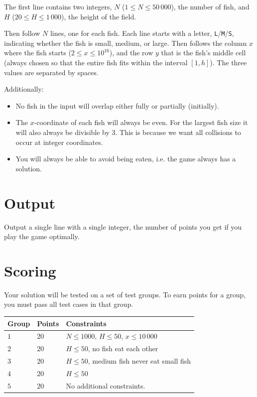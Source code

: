 The first line contains two integers, $N$ ($1 \leq N \leq 50\,000$), the number of fish, and $H$ ($20 \leq H \leq 1\,000$),
the height of the field. 

Then follow $N$ lines, one for each fish. Each line starts with a letter, \texttt{L}/\texttt{M}/\texttt{S},
indicating whether the fish is small, medium, or large. Then follows the column $x$ where the fish starts ($2 \leq x \leq 10^{16}$),
and the row $y$ that is the fish's middle cell (always chosen so that the entire fish fits within the interval $[1, h]$).
The three values are separated by spaces.

Additionally:
\begin{itemize}
  \item
    No fish in the input will overlap either fully or partially (initially).
  \item
      The $x$-coordinate of each fish will always be even. For the largest
      fish size it will also always be divisible by 3. This is
      because we want all collisions to occur at integer coordinates.
  \item
    You will always be able to avoid being eaten, i.e. the game always
    has a solution.
\end{itemize}

\section*{Output}
Output a single line with a single integer, the number of points you get if you play the game optimally.

\section*{Scoring}
Your solution will be tested on a set of test groups.
To earn points for a group, you must pass all test cases in that group.

\noindent
\begin{tabular}{| l | l | l |}
  \hline
  \textbf{Group} & \textbf{Points} & \textbf{Constraints} \\ \hline
  $1$   & $20$       & $N \leq 1000$, $H \leq 50$, $x \leq 10\,000$ \\ \hline
  $2$   & $20$       & $H \leq 50$, no fish eat each other \\ \hline
  $3$   & $20$       & $H \leq 50$, medium fish never eat small fish \\ \hline
  $4$   & $20$       & $H \leq 50$ \\ \hline
  $5$   & $20$       & No additional constraints. \\ \hline
\end{tabular}


